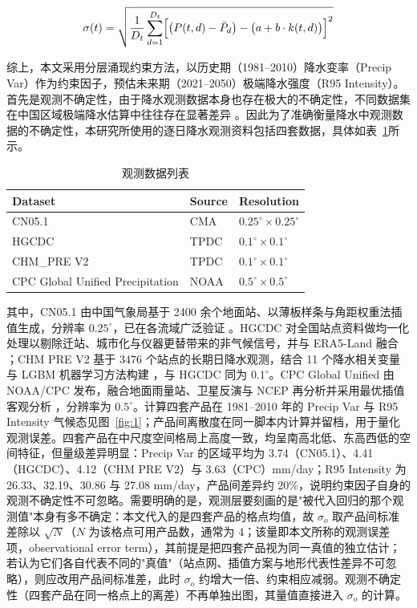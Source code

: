 \documentclass[draft]{agujournal2019}
\begin{document}
\begin{linenomath*}
\begin{equation}
\sigma(t) = \sqrt{\frac{1}{D_t}\sum_{d=1}^{D_t} \Bigl[\bigl(P(t,d)-\bar{P}_d\bigr) - \bigl(a + b\cdot k(t,d)\bigr)\Bigr]^2}
\label{eq:7}
\end{equation}
\end{linenomath*}

综上，本文采用分层涌现约束方法，以历史期（1981--2010）降水变率（Precip Var）作为约束因子，预估未来期（2021--2050）极端降水强度（R95 Intensity）。首先是观测不确定性，由于降水观测数据本身也存在极大的不确定性，不同数据集在中国区域极端降水估算中往往存在显著差异 \cite{wan_evaluation_2025}。因此为了准确衡量降水中观测数据的不确定性，本研究所使用的逐日降水观测资料包括四套数据，具体如表~\ref{tab:1}所示。

\begin{table}[htbp]
\caption{观测数据列表}
\label{tab:1}
\centering
\begin{tabular}{lll}
\hline
Dataset & Source & Resolution \\
\hline
CN05.1 & CMA & $0.25^\circ \times 0.25^\circ$ \\
HGCDC & TPDC & $0.1^\circ \times 0.1^\circ$ \\
CHM\_PRE V2 & TPDC & $0.1^\circ \times 0.1^\circ$ \\
CPC Global Unified Precipitation & NOAA & $0.5^\circ \times 0.5^\circ$ \\
\hline
\end{tabular}
\end{table}

其中，CN05.1 由中国气象局基于 2400 余个地面站、以薄板样条与角距权重法插值生成，分辨率 \(0.25^\circ\)，已在各流域广泛验证 \cite{wu_changes_2017}。HGCDC 对全国站点资料做均一化处理以剔除迁站、城市化与仪器更替带来的非气候信号，并与 ERA5-Land 融合 \cite{zhang_homogenization_2023}；CHM PRE V2 基于 3476 个站点的长期日降水观测，结合 11 个降水相关变量与 LGBM 机器学习方法构建 \cite{hu_upgraded_2025}，与 HGCDC 同为 \(0.1^\circ\)。CPC Global Unified 由 NOAA/CPC 发布，融合地面雨量站、卫星反演与 NCEP 再分析并采用最优插值客观分析 \cite{xie_gauge-based_2007}，分辨率为 \(0.5^\circ\)。计算四套产品在 1981--2010 年的 Precip Var 与 R95 Intensity 气候态见图~\ref{fig:1}；产品间离散度在同一脚本内计算并留档，用于量化观测误差。四套产品在中尺度空间格局上高度一致，均呈南高北低、东高西低的空间特征，但量级差异明显：Precip Var 的区域平均为 3.74（CN05.1）、4.41（HGCDC）、4.12（CHM PRE V2）与 3.63（CPC）mm/day；R95 Intensity 为 26.33、32.19、30.86 与 27.08 mm/day，产品间差异约 20\%，说明约束因子自身的观测不确定性不可忽略。需要明确的是，观测层要刻画的是"被代入回归的那个观测值"本身有多不确定：本文代入的是四套产品的格点均值，故 \(\sigma_o\) 取产品间标准差除以 \(\sqrt{N}\)（\(N\) 为该格点可用产品数，通常为 4；该量即本文所称的观测误差项，observational error term），其前提是把四套产品视为同一真值的独立估计；若认为它们各自代表不同的"真值"（站点网、插值方案与地形代表性差异不可忽略），则应改用产品间标准差，此时 \(\sigma_o\) 约增大一倍、约束相应减弱。观测不确定性（四套产品在同一格点上的离差）不再单独出图，其量值直接进入 \(\sigma_o\) 的计算。
\end{document}
